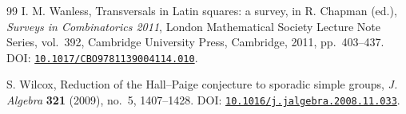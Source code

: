 \documentclass[11pt]{article}
\newcommand{\doilink}[1]{\href{https://doi.org/#1}{\nolinkurl{#1}}}
\theoremstyle{plain}
\theoremstyle{remark}
\theoremstyle{definition}
\theoremstyle{plain}
\begin{document}
\begin{thebibliography}{99}
I. M. Wanless,
Transversals in Latin squares: a survey,
in R. Chapman (ed.),
\emph{Surveys in Combinatorics 2011},
London Mathematical Society Lecture Note Series, vol.~392,
Cambridge University Press, Cambridge, 2011, pp.~403--437.
DOI: \doilink{10.1017/CBO9781139004114.010}.

S. Wilcox,
Reduction of the Hall--Paige conjecture to sporadic simple groups,
\textit{J. Algebra} \textbf{321} (2009), no.~5, 1407--1428.
DOI: \doilink{10.1016/j.jalgebra.2008.11.033}.

\end{thebibliography}
\end{document}
